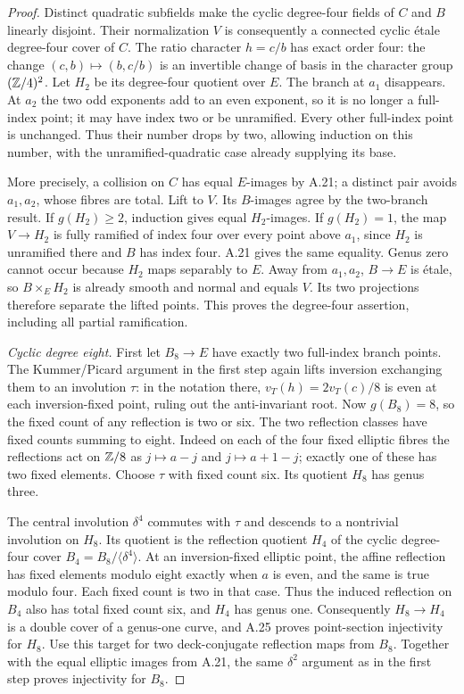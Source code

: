 \begin{proof}
Distinct quadratic subfields make the cyclic
degree-four fields of $C$ and $B$ linearly disjoint.
Their normalization $V$ is consequently a connected
cyclic \'etale degree-four cover of $C$. The ratio
character $h=c/b$ has exact order four: the change
$(c,b)\mapsto(b,c/b)$ is an invertible change of basis
in the character group $(\mathbb Z/4)^2$. Let $H_2$ be its
degree-four quotient over $E$. The branch at $a_1$
disappears. At $a_2$ the two odd exponents add to an
even exponent, so it is no longer a full-index point;
it may have index two or be unramified. Every other
full-index point is unchanged. Thus their number drops
by two, allowing induction on this number, with the
unramified-quadratic case already supplying its base.

More precisely, a collision on $C$ has equal $E$-images
by A.21; a distinct pair avoids $a_1,a_2$, whose fibres
are total. Lift to $V$. Its $B$-images agree by the
two-branch result. If $g(H_2)\ge2$, induction gives
equal $H_2$-images. If $g(H_2)=1$, the map $V\to H_2$
is fully ramified of index four over every point above
$a_1$, since $H_2$ is unramified there and $B$ has
index four. A.21 gives the same equality. Genus zero
cannot occur because $H_2$ maps separably to $E$.
Away from $a_1,a_2$, $B\to E$ is \'etale, so
$B\times_EH_2$ is already smooth and normal and equals
$V$. Its two projections therefore separate the lifted
points. This proves the degree-four assertion, including
all partial ramification.

\emph{Cyclic degree eight.}
First let $B_8\to E$ have exactly two full-index branch
points. The Kummer/Picard argument in the first step
again lifts inversion exchanging them to an involution
$\tau$: in the notation there, $v_T(h)=2v_T(c)/8$ is
even at each inversion-fixed point, ruling out the
anti-invariant root. Now $g(B_8)=8$, so the fixed count
of any reflection is two or six. The two reflection
classes have fixed counts summing to eight. Indeed on
each of the four fixed elliptic fibres the reflections
act on $\mathbb Z/8$ as $j\mapsto a-j$ and $j\mapsto a+1-j$;
exactly one of these has two fixed elements. Choose
$\tau$ with fixed count six. Its quotient $H_8$ has
genus three.

The central involution $\delta^4$ commutes with $\tau$
and descends to a nontrivial involution on $H_8$. Its
quotient is the reflection quotient $H_4$ of the cyclic
degree-four cover $B_4=B_8/\langle\delta^4\rangle$.
At an inversion-fixed elliptic point, the affine
reflection has fixed elements modulo eight exactly when
$a$ is even, and the same is true modulo four. Each
fixed count is two in that case. Thus the induced
reflection on $B_4$ also has total fixed count six,
and $H_4$ has genus one. Consequently
$H_8\to H_4$ is a double cover of a genus-one curve,
and A.25 proves point-section injectivity for $H_8$.
Use this target for two deck-conjugate reflection maps
from $B_8$. Together with the equal elliptic images
from A.21, the same $\delta^2$ argument as in the first
step proves injectivity for $B_8$.


\end{proof}
